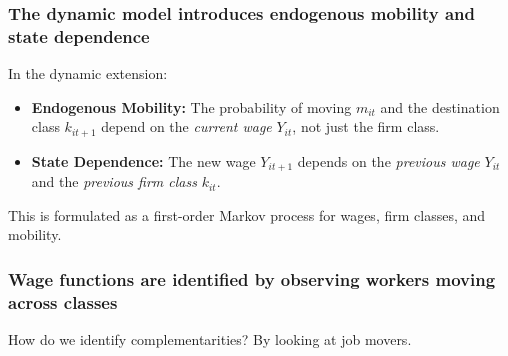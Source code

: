 \begin{frame}
    \frametitle{The dynamic model introduces endogenous mobility and state dependence}
    
    In the dynamic extension:
    \begin{itemize}
        \item \textbf{Endogenous Mobility:} The probability of moving $m_{it}$ and the destination class $k_{it+1}$ depend on the \textit{current wage} $Y_{it}$, not just the firm class.
        \item \textbf{State Dependence:} The new wage $Y_{it+1}$ depends on the \textit{previous wage} $Y_{it}$ and the \textit{previous firm class} $k_{it}$.
    \end{itemize}
    
    \vspace{0.5cm}
    This is formulated as a first-order Markov process for wages, firm classes, and mobility.
\end{frame}

\begin{frame}
    \frametitle{Wage functions are identified by observing workers moving across classes}
    
    How do we identify complementarities? By looking at job movers.
    
    \vspace{0.5cm}
    \begin{center}
    \end{center}
\end{frame}

